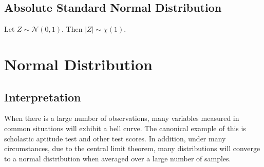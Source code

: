 \documentclass[1pt]{report}
\newcommand{\<}{\langle}
\renewcommand{\>}{\rangle}
\newcommand{\NN}{\mathcal{N}}
\begin{document}
\subsection{Absolute Standard Normal Distribution}
Let $Z \sim \NN(0,1)$. Then $|Z| \sim \chi(1)$.
\newpage
\section{Normal Distribution}
\subsection{Interpretation} 
When there is a large number of observations, many variables measured in common situations will exhibit a bell curve. The canonical example of this is scholastic aptitude test and other test scores. In addition, under many circumstances, due to the central limit theorem, many distributions will converge to a normal distribution when averaged over a large number of samples.
\end{document}
